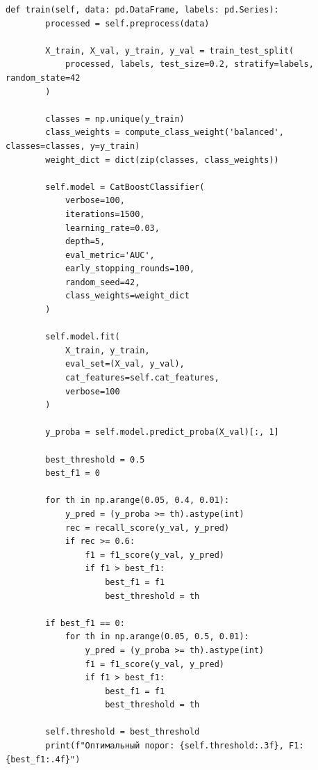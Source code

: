 \vspace{1cm}

\begin{lstlisting}[caption={Обучение модели CatBoostClassifier}, label={lst:training}
    caption={Код генерации производных признаков}, 
    label={lst:feature_eng},
    breaklines=true,
    breakatwhitespace=true,
    breakindent=10pt,
    columns=fullflexible
]
def train(self, data: pd.DataFrame, labels: pd.Series):
        processed = self.preprocess(data)

        X_train, X_val, y_train, y_val = train_test_split(
            processed, labels, test_size=0.2, stratify=labels, random_state=42
        )

        classes = np.unique(y_train)
        class_weights = compute_class_weight('balanced', classes=classes, y=y_train)
        weight_dict = dict(zip(classes, class_weights))

        self.model = CatBoostClassifier(
            verbose=100,
            iterations=1500,
            learning_rate=0.03,
            depth=5,
            eval_metric='AUC',
            early_stopping_rounds=100,
            random_seed=42,
            class_weights=weight_dict
        )

        self.model.fit(
            X_train, y_train,
            eval_set=(X_val, y_val),
            cat_features=self.cat_features,
            verbose=100
        )

        y_proba = self.model.predict_proba(X_val)[:, 1]

        best_threshold = 0.5
        best_f1 = 0

        for th in np.arange(0.05, 0.4, 0.01):
            y_pred = (y_proba >= th).astype(int)
            rec = recall_score(y_val, y_pred)
            if rec >= 0.6:
                f1 = f1_score(y_val, y_pred)
                if f1 > best_f1:
                    best_f1 = f1
                    best_threshold = th

        if best_f1 == 0:
            for th in np.arange(0.05, 0.5, 0.01):
                y_pred = (y_proba >= th).astype(int)
                f1 = f1_score(y_val, y_pred)
                if f1 > best_f1:
                    best_f1 = f1
                    best_threshold = th

        self.threshold = best_threshold
        print(f"Оптимальный порог: {self.threshold:.3f}, F1: {best_f1:.4f}")

\end{lstlisting}

